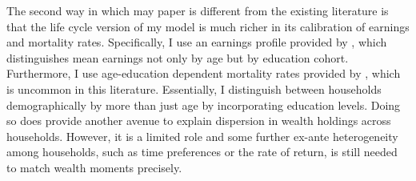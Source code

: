 \par The second way in which may paper is different from the existing literature is that the life cycle version of my model is much richer in its calibration of earnings and mortality rates. Specifically, I use an earnings profile provided by \cite{Cagetti2003}, which distinguishes mean earnings not only by age but by education cohort. Furthermore, I use age-education dependent mortality rates provided by \cite{Brown2007}, which is uncommon in this literature. Essentially, I distinguish between households demographically by more than just age by incorporating education levels. Doing so does provide another avenue to explain dispersion in wealth holdings across households. However, it is a limited role and some further ex-ante heterogeneity among households, such as time preferences or the rate of return, is still needed to match wealth moments precisely. 